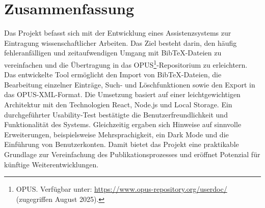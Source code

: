 \chapter*{Zusammenfassung}
Das Projekt befasst sich mit der Entwicklung eines Assistenzsystems zur 
Eintragung wissenschaftlicher Arbeiten. Das Ziel besteht darin, den 
häufig fehleranfälligen und zeitaufwendigen Umgang mit BibTeX-Dateien 
zu vereinfachen und die Übertragung in das OPUS\footnote{OPUS. Verfügbar unter: 
\url{https://www.opus-repository.org/userdoc/} (zugegriffen August 2025).}-Repositorium zu erleichtern. 
Das entwickelte Tool ermöglicht den Import von BibTeX-Dateien, die Bearbeitung 
einzelner Einträge, Such- und Löschfunktionen sowie den Export in das 
OPUS-XML-Format. Die Umsetzung basiert auf einer leichtgewichtigen 
Architektur mit den Technologien React, Node.js und Local Storage. 
Ein durchgeführter Usability-Test bestätigte die Benutzerfreundlichkeit 
und Funktionalität des Systems. Gleichzeitig ergaben sich Hinweise auf 
sinnvolle Erweiterungen, beispielsweise Mehrsprachigkeit, ein Dark Mode 
und die Einführung von Benutzerkonten. Damit bietet das Projekt eine 
praktikable Grundlage zur Vereinfachung des Publikationsprozesses und 
eröffnet Potenzial für künftige Weiterentwicklungen.

